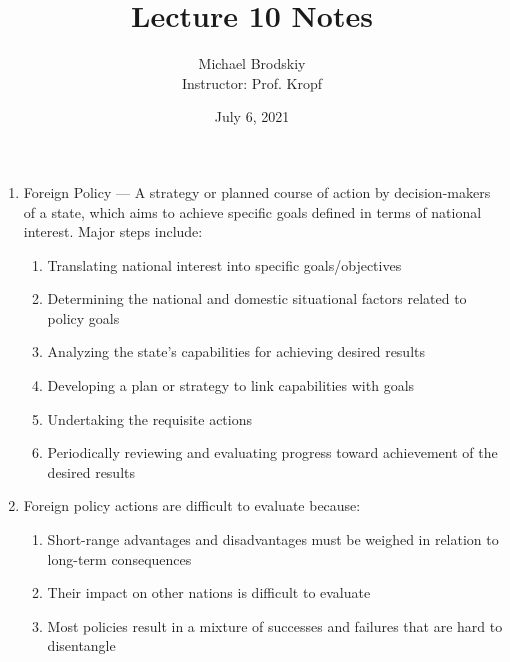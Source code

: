\documentclass[12pt]{article}
\title{Lecture 10 Notes}
\date{July 6, 2021}
\author{Michael Brodskiy\\ \small Instructor: Prof. Kropf}
\begin{document}
    \maketitle

    \begin{enumerate}

      \item Foreign Policy — A strategy or planned course of action by decision-makers of a state, which aims to achieve specific goals defined in terms of national interest. Major steps include:

        \begin{enumerate}

          \item Translating national interest into specific goals/objectives

          \item Determining the national and domestic situational factors related to policy goals

          \item Analyzing the state's capabilities for achieving desired results

          \item Developing a plan or strategy to link capabilities with goals

          \item Undertaking the requisite actions

          \item Periodically reviewing and evaluating progress toward achievement of the desired results

        \end{enumerate}

      \item Foreign policy actions are difficult to evaluate because:

        \begin{enumerate}

          \item Short-range advantages and disadvantages must be weighed in relation to long-term consequences

          \item Their impact on other nations is difficult to evaluate

          \item Most policies result in a mixture of successes and failures that are hard to disentangle

        \end{enumerate}


\end{enumerate}
\end{document}
